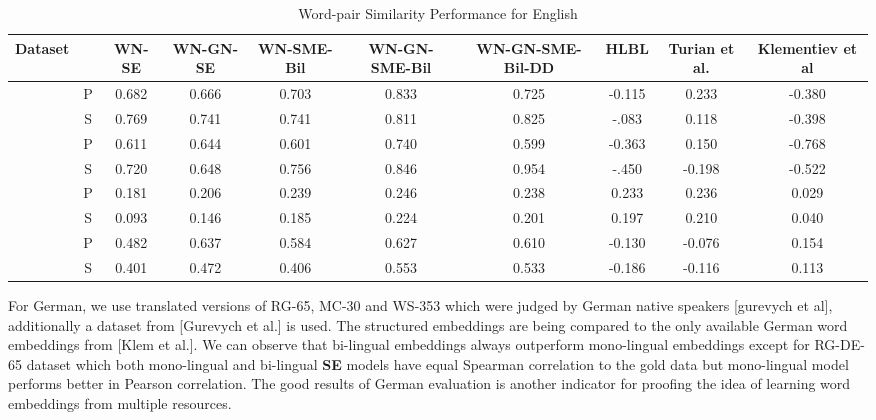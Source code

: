  
 \begin{table}[ht]
\caption{Word-pair Similarity Performance for English } %
\label{tbl:en-wp-sim}
\centering %
\tabcolsep=0.09cm
{\footnotesize
\begin{tabular}{c c c c c c c c c c} 
\hline\hline %
 Dataset & & WN-SE  & WN-GN-SE & WN-SME-Bil &  WN-GN-SME-Bil & WN-GN-SME-Bil-DD
 &HLBL& Turian et al.& Klementiev et al
\\ [0.5ex] 
\hline %
                          &P&0.682&0.666&0.703&0.833&0.725&-0.115&0.233&-0.380 \\[-1ex]
\raisebox{1.5ex}{RG-65}  &S&0.769&0.741&0.741&0.811&0.825&-.083&0.118&-0.398 \\[1ex]

                          &  P &0.611&0.644&0.601&0.740&0.599&-0.363&0.150&-0.768 \\[-1ex]
\raisebox{1.5ex}{MC-30}  &  S & 0.720&0.648&0.756&0.846&0.954&-.450&-0.198&-0.522 \\[1ex]

                           &  P &0.181&0.206&0.239&0.246&0.238&0.233&0.236&0.029 \\[-1ex]
\raisebox{1.5ex}{WS-353}  &  S &0.093&0.146&0.185&0.224&0.201&0.197&0.210&0.040 \\[1ex]


                                  &  P & 0.482&0.637&0.584&0.627&0.610&-0.130&-0.076&0.154 \\[-1ex]
\raisebox{1.5ex}{YangPowers-130}  &  S & 0.401&0.472&0.406&0.553&0.533&-0.186&-0.116& 0.113 \\[1ex]

\hline %
     
          
 \hline %
\end{tabular}
}
\label{tab:en-wp-sim}
\end{table}      


For German,
 we use translated versions of RG-65, MC-30 and WS-353 which were judged by
 German native speakers \cite{??} [gurevych et al], additionally a dataset from
 \cite{??} [Gurevych et al.] is used. The structured embeddings are being
 compared to the only available German word embeddings from
 \cite{Klementiev}[Klem et al.]. We can observe that bi-lingual embeddings
 always outperform mono-lingual embeddings except for RG-DE-65 dataset which
 both mono-lingual and bi-lingual \textbf{SE} models have equal Spearman
 correlation to the gold data but mono-lingual model performs better in Pearson
 correlation. The good results of German evaluation is another indicator for
 proofing the idea of learning word embeddings from multiple resources.

